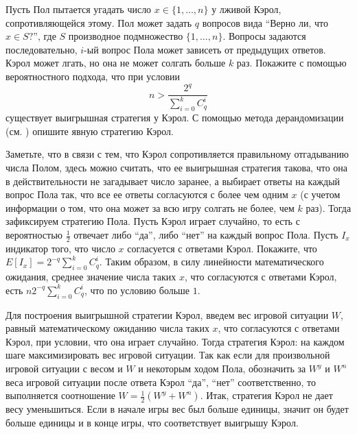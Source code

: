 \begin{problem} 
Пусть Пол пытается угадать число $x\in \{1,\ldots ,n\}$ 
у лживой Кэрол, сопротивляющейся этому. Пол может задать $q$ вопросов вида ``Верно ли, что $x\in S?$'', где $S$ {\-} производное подмножество $\{1,\ldots ,n\}$. Вопросы задаются последовательно, $i$-ый вопрос Пола может зависеть от предыдущих ответов. Кэрол может лгать, но она не может солгать больше $k$ раз. Покажите с помощью вероятностного подхода, что при условии
\[
n>\frac{2^q}{\sum\limits_{i=0}^k {C_q^i } }
\]
существует выигрышная стратегия у Кэрол. С помощью метода дерандомизации (см. \cite{15}) опишите явную стратегию Кэрол.
\end{problem}

\begin{ordre}
Заметьте, что в связи с тем, что Кэрол сопротивляется 
правильному отгадыванию числа Полом, здесь можно считать, что ее выигрышная стратегия такова, что она в действительности не загадывает число заранее, а выбирает ответы на каждый вопрос Пола так, что все ее ответы согласуются с более чем одним $x$ (с учетом информации о том, что она может за всю игру солгать не более, чем $k$ раз). Тогда зафиксируем стратегию Пола. Пусть Кэрол играет случайно, то есть с вероятностью $\frac{1}{2}$ отвечает либо ``да'', либо ``нет'' на каждый вопрос Пола. Пусть $I_x $ {\-} индикатор того, что число $x$ согласуется с ответами Кэрол. Покажите, что $E\left[ {I_x } \right]=2^{-q}\sum_{i=0}^k {C_q^i } $. Таким образом, в силу 
линейности математического ожидания, среднее значение числа таких $x$, что согласуются с ответами Кэрол, есть $n2^{-q}\sum_{i=0}^k {C_q^i } $, что по условию больше $1$.

Для построения выигрышной стратегии Кэрол, введем вес игровой ситуации $W$, равный математическому ожиданию числа таких $x$, что согласуются с ответами Кэрол, при условии, что она играет случайно. Тогда стратегия Кэрол: на каждом шаге максимизировать вес игровой ситуации. Так как если для произвольной игровой ситуации с весом и $W$ и некоторым ходом Пола, обозначить за $W^y$ и $W^n$ веса игровой ситуации после ответа Кэрол ``да'', ``нет'' соответственно, то выполняется соотношение $W=\frac{1}{2}(W^y+W^n)$. Итак, стратегия Кэрол не дает весу уменьшиться. Если в начале игры вес был 
больше единицы, значит он будет больше единицы и в конце игры, что 
соответствует выигрышу Кэрол.

\end{ordre}




